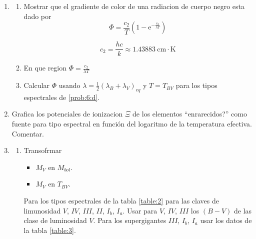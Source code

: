 \documentclass[12pt,spanish,a4paper]{practice}
\begin{document}
\begin{enumerate}[wide, labelwidth=!, labelindent=0pt, label=\textbf{\arabic*)}, ref=\arabic*]
        \item\label{prob:12}\hfill
            \begin{enumerate}[label=\alph*., ref=\theenumi\alph*]
                \item\label{prob:12:a} Mostrar que el gradiente de color de una radiacion de cuerpo negro esta dado por
                    $$
                    \Phi = \frac{c_2}{T}\left(1 - \mathrm{e}^{-\frac{c_2}{\lambda T}}\right)
                    $$

                    $$
                    c_2 = \frac{hc}{k} \approx 1.43883\ \mathrm{cm \cdot K}
                    $$

                \item\label{prob:12:b} En que region $\Phi = \frac{c_2}{\lambda T}$

                \item\label{prob:12:c} Calcular $\Phi$ usando $\lambda = \frac{1}{2}\left(\lambda_B + \lambda_V\right)_{eq}$ y $T = T_{BV}$ para los tipos espectrales de \ref{prob:6:d}.
            \end{enumerate}

        \item\label{prob:13} Grafica los potenciales de ionizacion $\Xi$ de los elementos ``enrarecidos?'' como fuente para tipo espectral en función del logaritmo de la temperatura efectiva. Comentar.

        \item\label{prob:14}\hfill
            \begin{enumerate}[label=\alph*., ref=\theenumi\alph*]
                \item \label{prob:14:a} Transofrmar
                    \begin{itemize}
                        \item\label{prob:14:a:i} $M_{V}$ en $M_{bol}$.
                        \item\label{prob:14:a:ii} $M_{V}$ en $T_{BV}$.
                    \end{itemize}

                    Para los tipos espectrales de la tabla \ref{table:2} para las claves de limunosidad $V$, $IV$, $III$, $II$, $I_{b}$, $I_{a}$.
                    Usar para $V$, $IV$, $III$ los $\left(B-V\right)$ de las clase de luminosidad $V$. Para los supergigantes $III$, $I_{b}$, $I_{a}$ usar los datos de la tabla \ref{table:3}.


\end{enumerate}
\end{enumerate}
\end{document}
